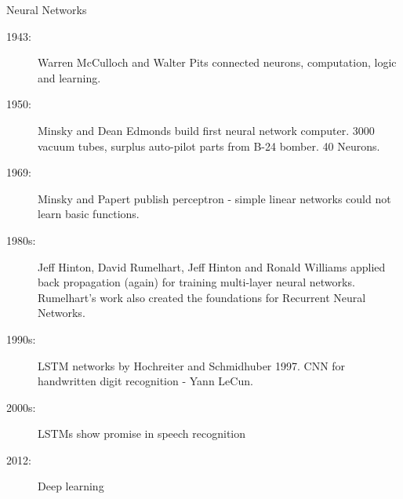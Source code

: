 \begin{frame}{Neural Networks}
	
	{\tiny 
	\begin{description}
		\item[1943:] Warren McCulloch and Walter Pits connected neurons, computation, logic and learning.
		\item[1950:] Minsky and Dean Edmonds build first neural network computer. 3000 vacuum tubes, surplus 
		auto-pilot parts from B-24 bomber. 40 Neurons. 
		\item[1969:] Minsky and Papert publish perceptron - simple linear networks could not learn basic 
		functions. 
		\item[1980s:] Jeff Hinton, David Rumelhart, Jeff Hinton and Ronald Williams applied back propagation 
		(again) for training multi-layer neural networks. Rumelhart's work also created the foundations for 
		Recurrent Neural Networks. 
		\item[1990s:] LSTM networks by Hochreiter and Schmidhuber 1997. CNN for handwritten digit recognition - Yann LeCun. 
		\item[2000s:] LSTMs show promise in speech recognition 
		\item[2012:] Deep learning
	\end{description}
	}
\end{frame}


